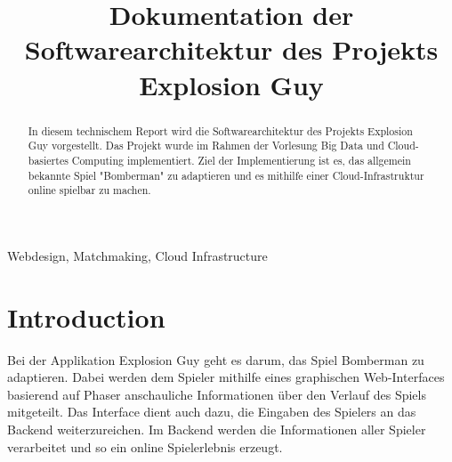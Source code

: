 \documentclass[conference]{IEEEtran}
\begin{document}
\title{Dokumentation der Softwarearchitektur des Projekts Explosion Guy}


\author{
	\and

	\and

	\and

	\and

}

\maketitle

\begin{abstract}
In diesem technischem Report wird die Softwarearchitektur des Projekts 
Explosion Guy vorgestellt. Das Projekt wurde im Rahmen der Vorlesung Big Data und Cloud-basiertes Computing implementiert. Ziel der Implementierung ist es, 
das allgemein bekannte Spiel "Bomberman" zu adaptieren und es mithilfe einer Cloud-Infrastruktur online spielbar zu machen.\\
\end{abstract}

\begin{IEEEkeywords}
 Webdesign, Matchmaking, Cloud Infrastructure
\end{IEEEkeywords}

\section{Introduction}
Bei der Applikation Explosion Guy geht es darum, das Spiel \glqq Bomberman\grqq{} zu adaptieren. Dabei werden dem Spieler mithilfe eines graphischen Web-Interfaces basierend auf Phaser anschauliche Informationen über den Verlauf des Spiels mitgeteilt. Das Interface dient auch dazu, die Eingaben des Spielers an das Backend weiterzureichen. Im Backend werden die Informationen aller Spieler verarbeitet und so ein online Spielerlebnis erzeugt.
\end{document}

